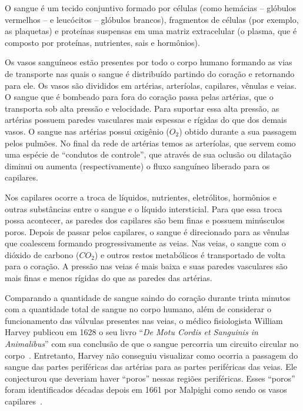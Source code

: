 O sangue é um tecido conjuntivo formado por células (como hemácias -- glóbulos 
vermelhos -- e leucócitos -- glóbulos brancos), fragmentos de células 
(por exemplo, as plaquetas) e proteínas suspensas em uma matriz extracelular 
(o plasma, que é composto por proteínas, nutrientes, sais e hormônios).

Os vasos sanguíneos estão presentes por todo o corpo humano formando as vias de transporte nas 
quais o sangue é distribuído partindo do coração e retornando para ele. Os vasos são 
divididos em artérias, arteríolas, capilares, vênulas e veias. O sangue que é bombeado 
para fora do coração passa pelas artérias, que o transporta sob alta pressão e velocidade.
Para suportar essa alta pressão, as artérias possuem paredes vasculares mais espessas e 
rígidas do que dos demais vasos. O sangue nas artérias possui oxigênio ($O_2$) obtido durante 
a sua passagem pelos pulmões. No final da rede de artérias temos as arteríolas, que 
servem como uma espécie de ``condutos de controle'', que através de sua oclusão ou dilatação 
diminui ou aumenta (respectivamente) o fluxo sanguíneo liberado para os capilares.

Nos capilares ocorre a troca de líquidos, nutrientes, eletrólitos, hormônios e outras 
substâncias entre o sangue e o líquido intersticial. Para que essa troca possa acontecer,
as paredes dos capilares são bem finas e possuem minúsculos poros. Depois de passar 
pelos capilares, o sangue é direcionado para as vênulas que coalescem formando progressivamente
as veias. Nas veias, o sangue com o dióxido de carbono ($CO_2$) e outros restos metabólicos é 
transportado de volta para o coração. A pressão nas veias é mais baixa e suas paredes 
vasculares são mais finas e menos rígidas do que as paredes das artérias. 

Comparando a quantidade de sangue saindo do coração durante trinta minutos com a quantidade 
total de sangue no corpo humano, além de considerar o funcionamento das válvulas presentes nas veias,
o médico fisiologista William Harvey publicou em 1628 o seu livro ``\textit{De Motu Cordis et Sanguinis in Animalibus}''
com sua conclusão de que o sangue percorria um circuito circular no corpo~\cite{Whitteridge1978}.
Entretanto, Harvey não conseguiu visualizar como ocorria a passagem do sangue das partes periféricas das artérias para 
as partes periféricas das veias. Ele conjecturou que deveriam haver ``poros'' nessas regiões periféricas. Esses ``poros''
foram identificados décadas depois em 1661 por Malpighi como sendo os vasos capilares~\cite{Cliff1976}.


